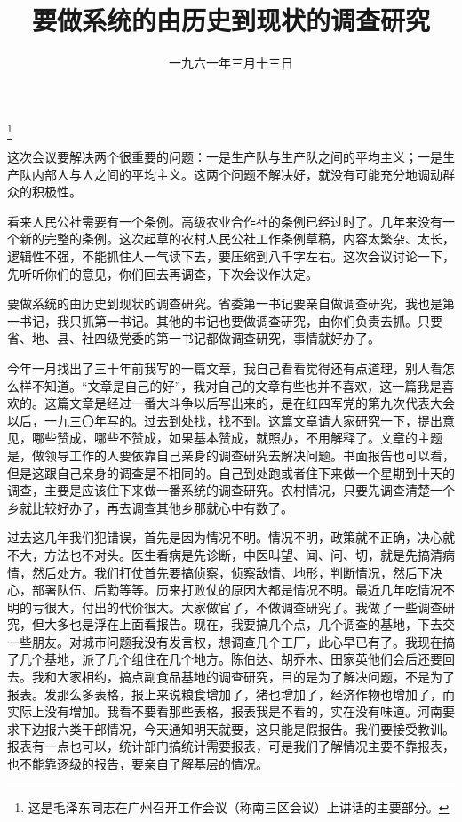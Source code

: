 
\title{要做系统的由历史到现状的调查研究}
\date{一九六一年三月十三日}
\thanks{这是毛泽东同志在广州召开工作会议（称南三区会议）上讲话的主要部分。}
\maketitle


这次会议要解决两个很重要的问题：一是生产队与生产队之间的平均主义；一是生产队内部人与人之间的平均主义。这两个问题不解决好，就没有可能充分地调动群众的积极性。

看来人民公社需要有一个条例。高级农业合作社的条例已经过时了。几年来没有一个新的完整的条例。这次起草的农村人民公社工作条例草稿，内容太繁杂、太长，逻辑性不强，不能抓住人一气读下去，要压缩到八千字左右。这次会议讨论一下，先听听你们的意见，你们回去再调查，下次会议作决定。

要做系统的由历史到现状的调查研究。省委第一书记要亲自做调查研究，我也是第一书记，我只抓第一书记。其他的书记也要做调查研究，由你们负责去抓。只要省、地、县、社四级党委的第一书记都做调查研究，事情就好办了。

今年一月找出了三十年前我写的一篇文章，我自己看看觉得还有点道理，别人看怎么样不知道。“文章是自己的好”，我对自己的文章有些也并不喜欢，这一篇我是喜欢的。这篇文章是经过一番大斗争以后写出来的，是在红四军党的第九次代表大会以后，一九三〇年写的。过去到处找，找不到。这篇文章请大家研究一下，提出意见，哪些赞成，哪些不赞成，如果基本赞成，就照办，不用解释了。文章的主题是，做领导工作的人要依靠自己亲身的调查研究去解决问题。书面报告也可以看，但是这跟自己亲身的调查是不相同的。自己到处跑或者住下来做一个星期到十天的调查，主要是应该住下来做一番系统的调查研究。农村情况，只要先调查清楚一个乡就比较好办了，再去调查其他乡那就心中有数了。

过去这几年我们犯错误，首先是因为情况不明。情况不明，政策就不正确，决心就不大，方法也不对头。医生看病是先诊断，中医叫望、闻、问、切，就是先搞清病情，然后处方。我们打仗首先要搞侦察，侦察敌情、地形，判断情况，然后下决心，部署队伍、后勤等等。历来打败仗的原因大都是情况不明。最近几年吃情况不明的亏很大，付出的代价很大。大家做官了，不做调查研究了。我做了一些调查研究，但大多也是浮在上面看报告。现在，我要搞几个点，几个调查的基地，下去交一些朋友。对城市问题我没有发言权，想调查几个工厂，此心早已有了。我现在搞了几个基地，派了几个组住在几个地方。陈伯达、胡乔木、田家英他们会后还要回去。我和大家相约，搞点副食品基地的调查研究，目的是为了解决问题，不是为了报表。发那么多表格，报上来说粮食增加了，猪也增加了，经济作物也增加了，而实际上没有增加。我看不要看那些表格，报表我是不看的，实在没有味道。河南要求下边报六类干部情况，今天通知明天就要，这只能是假报告。我们要接受教训。报表有一点也可以，统计部门搞统计需要报表，可是我们了解情况主要不靠报表，也不能靠逐级的报告，要亲自了解基层的情况。

